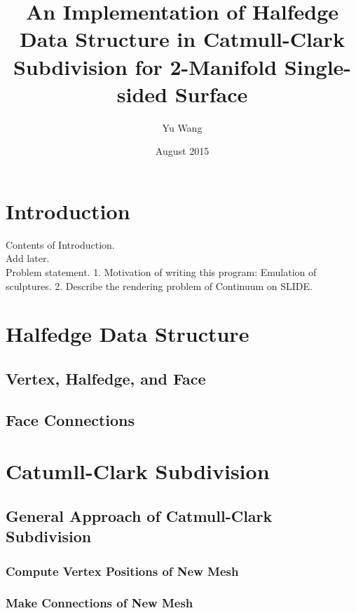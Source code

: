 \documentclass[12pt]{article}
\title{An Implementation of Halfedge Data Structure in Catmull-Clark Subdivision for 2-Manifold Single-sided Surface}
\author{Yu Wang}
\date{August 2015}
\begin{document}
\maketitle
\newpage


\section{Introduction}
Contents of Introduction.\\
 Add later.\\
Problem statement. 1. Motivation of writing this program: Emulation of sculptures. 2. Describe the rendering problem of Continuum on SLIDE.\\
\section{Halfedge Data Structure}

\subsection{Vertex, Halfedge, and Face}

\subsection{Face Connections}

\section{Catumll-Clark Subdivision}

\subsection{General Approach of Catmull-Clark Subdivision}

\subsubsection{Compute Vertex Positions of New Mesh}

\subsubsection{Make Connections of New Mesh}
\end{document}
